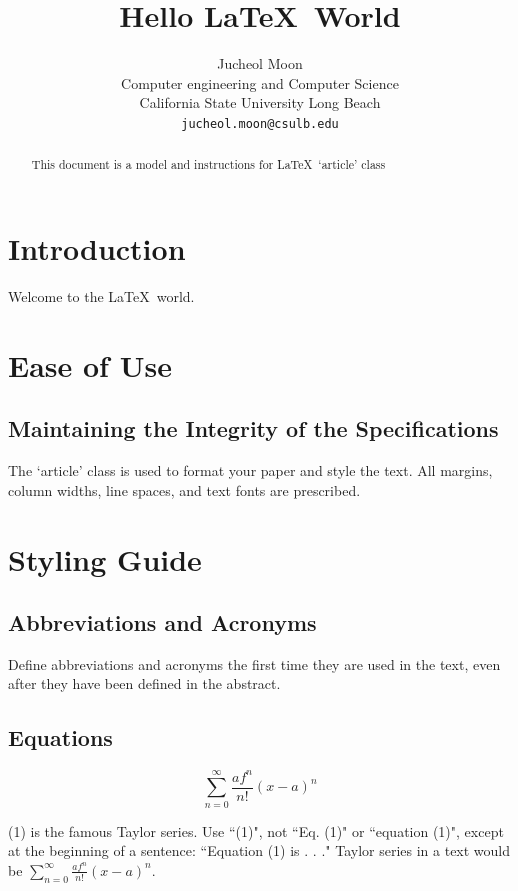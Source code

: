 \documentclass{article}
\begin{document}
\title{\Large Hello \LaTeX\ World}
\date{}
\author{Jucheol Moon\\\small Computer engineering and Computer Science\\\small California State University Long Beach\\\small\texttt{jucheol.moon@csulb.edu}}
\maketitle
\begin{abstract}
This document is a model and instructions for \LaTeX\ `article' class
\end{abstract}

\section{Introduction}
Welcome to the \LaTeX\ world.

\section{Ease of Use}

\subsection{Maintaining the Integrity of the Specifications}
The `article' class is used to format your paper and style the text. All margins, column widths, line spaces, and text fonts are prescribed.

\section{Styling Guide}

\subsection{Abbreviations and Acronyms}
Define abbreviations and acronyms the first time they are used in the text, 
even after they have been defined in the abstract.

\subsection{Equations}
\begin{equation}
\sum_{n=0}^\infty\frac{af^n}{n!}(x-a)^n
\end{equation}

\noindent(1) is the famous Taylor series. Use ``(1)", not ``Eq. (1)" or ``equation (1)", except at the beginning of a sentence: ``Equation (1) is . . ."
\newline\indent Taylor series in a text would be $\sum_{n=0}^\infty\frac{af^n}{n!}(x-a)^n$.
\end{document}
